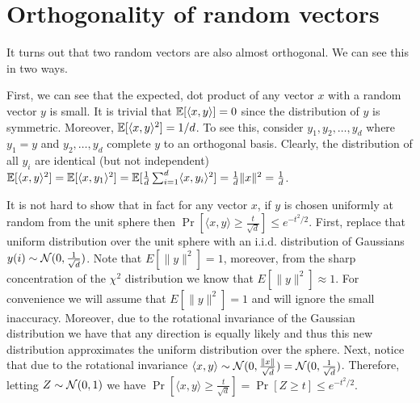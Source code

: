 \documentclass{article}
\begin{document}
\section{Orthogonality of random vectors}

It turns out that two random vectors are also almost orthogonal.
We can see this in two ways.

First, we can see that the expected, dot product of any vector $x$ with a random vector $y$ is small.
It is trivial that ${\mathbb E}[\langle x,y \rangle] = 0$ since the distribution of $y$ is symmetric.
Moreover, ${\mathbb E}[\langle x,y \rangle^2] = 1/d$.
To see this, consider $y_1,y_2,\ldots,y_d$ where $y_1 = y$ and $y_2,\ldots,y_d$ complete $y$ to an orthogonal basis.
Clearly, the distribution of all $y_i$ are identical (but not independent)
${\mathbb E}[\langle x,y \rangle^2] = {\mathbb E}[\langle x,y_1\rangle^2] = {\mathbb E}[\frac{1}{d}\sum_{i=1}^{d}\langle x,y_i\rangle^2] = \frac{1}{d}\|x\|^2 = \frac{1}{d}$.

It is not hard to show that in fact for any vector $x$, if $y$ is chosen uniformly at random from the unit sphere 
then $\Pr[ \langle x,y \rangle  \ge \frac{t}{\sqrt{d}}] \le e^{-t^2/2}$.
First, replace that uniform distribution over the unit sphere with an i.i.d. distribution of Gaussians $y(i)\sim {\mathcal{N}}(0,\frac{1}{\sqrt{d}})$.
Note that $E[\|y\|^2] = 1$, moreover, from the sharp concentration of the $\chi^2$ distribution we know that $E[\|y\|^2] \approx 1$.
For convenience we will assume that $E[\|y\|^2] = 1$ and will ignore the small inaccuracy.
Moreover, due to the rotational invariance of the Gaussian distribution we have that any direction is equally likely and thus this
new distribution approximates the uniform distribution over the sphere.
Next, notice that due to the rotational invariance $\langle x,y \rangle \sim {\mathcal{N}}(0,\frac{\|x\|}{\sqrt{d}}) = {\mathcal{N}}(0,\frac{1}{\sqrt{d}})$.
Therefore, letting $Z \sim {\mathcal{N}}(0,1)$ we have $\Pr[ \langle x,y \rangle  \ge \frac{t}{\sqrt{d}}] = \Pr[Z \ge t] \le e^{-t^2/2}$.



\end{document}
